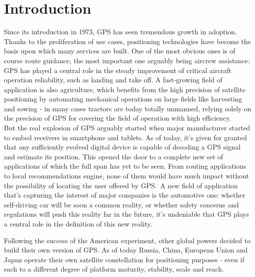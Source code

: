 \chapter{Introduction}
\label{introduction}


Since its introduction in 1973, GPS has seen tremendous growth in adoption.
Thanks to the proliferation of use cases, positioning technologies have become
the basis upon which many services are built. One of the most obvious ones is of
course route guidance, the most important one arguably being aircrew assistance:
GPS has played a central role in the steady improvement of critical aircraft
operation reliability, such as landing and take off. A fast-growing field of
application is also agriculture, which benefits from the high precision of
satellite positioning by automating mechanical operations on large fields like
harvesting and sowing - in many cases tractors are today totally unmanned,
relying solely on the precision of GPS for covering the field of operation with
high efficiency.\\
But the real explosion of GPS arguably started when major manufacturer started
to embed receivers in smartphone and tablets. As of today, it's given for
granted that any sufficiently evolved digital device is capable of decoding a
GPS signal and estimate its position. This opened the door to a complete new set
of applications of which the full span has yet to be seen. From routing
applications to local recommendations engine, none of them would have much
impact without the possibility of locating the user offered by GPS.\
A new field of application that's capturing the interest of major companies is
the automotive one: whether self-driving car will be soon a common reality, or
whether safety concerns and regulations will push this reality far in the
future, it's undeniable that GPS plays a central role in the definition of this
new reality.

Following the success of the American experiment, other global powers decided to
build their own version of GPS. As of today Russia, China, European Union and
Japan operate their own satellite constellation for positioning purposes - even
if each to a different degree of platform maturity, stability, scale and reach.
